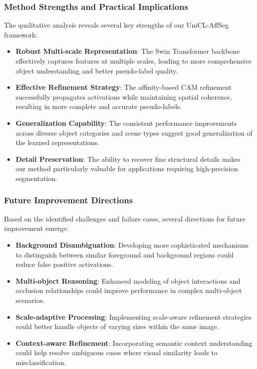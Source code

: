 \subsubsection{Method Strengths and Practical Implications}
\label{subsubsec:method_strengths}

The qualitative analysis reveals several key strengths of our UniCL-AffSeg framework:

\begin{itemize}
    \item \textbf{Robust Multi-scale Representation}: The Swin Transformer backbone effectively captures features at multiple scales, leading to more comprehensive object understanding and better pseudo-label quality.
    
    \item \textbf{Effective Refinement Strategy}: The affinity-based CAM refinement successfully propagates activations while maintaining spatial coherence, resulting in more complete and accurate pseudo-labels.
    
    \item \textbf{Generalization Capability}: The consistent performance improvements across diverse object categories and scene types suggest good generalization of the learned representations.
    
    \item \textbf{Detail Preservation}: The ability to recover fine structural details makes our method particularly valuable for applications requiring high-precision segmentation.
\end{itemize}

\subsubsection{Future Improvement Directions}
\label{subsubsec:future_improvements}

Based on the identified challenges and failure cases, several directions for future improvement emerge:

\begin{itemize}
    \item \textbf{Background Disambiguation}: Developing more sophisticated mechanisms to distinguish between similar foreground and background regions could reduce false positive activations.
    
    \item \textbf{Multi-object Reasoning}: Enhanced modeling of object interactions and occlusion relationships could improve performance in complex multi-object scenarios.
    
    \item \textbf{Scale-adaptive Processing}: Implementing scale-aware refinement strategies could better handle objects of varying sizes within the same image.
    
    \item \textbf{Context-aware Refinement}: Incorporating semantic context understanding could help resolve ambiguous cases where visual similarity leads to misclassification.
\end{itemize}

